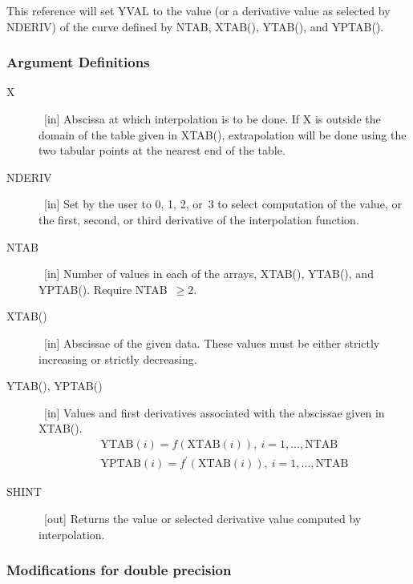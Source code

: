 \documentclass[twoside]{MATH77}
\begin{document}
\begin{center}
\end{center}

This reference will set YVAL to the value (or a derivative value as selected
by NDERIV) of the curve defined by NTAB, XTAB(), YTAB(), and YPTAB().

\subsubsection{Argument Definitions}

\begin{description}
\item[X]  \ [in] Abscissa at which interpolation is to be done. If X is
outside the domain of the table given in XTAB(), extrapolation will be done
using the two tabular points at the nearest end of the table.

\item[NDERIV]  \ [in] Set by the user to 0, 1, 2, or~3 to select computation
of the value, or the first, second, or third derivative of the interpolation
function.

\item[NTAB]  \ [in] Number of values in each of the arrays, XTAB(), YTAB(),
and YPTAB(). Require NTAB\ $\geq 2.$

\item[XTAB()]  \ [in] Abscissae of the given data. These values must be
either strictly increasing or strictly decreasing.

\item[YTAB(), YPTAB()]  \ [in] Values and first derivatives associated with
the abscissae given in XTAB().\vspace{-4pt}%
\begin{gather*}
\text{YTAB}(i)=f(\text{XTAB}(i)),\ i=1,...,\text{NTAB}\\
\text{YPTAB}(i)=f^{\prime }(\text{XTAB}(i)),\ i=1,...,\text{NTAB}
\end{gather*}
\item[SHINT]  \ [out] Returns the value or selected derivative value
computed by interpolation.
\end{description}

\subsubsection{Modifications for double precision}
\end{document}
